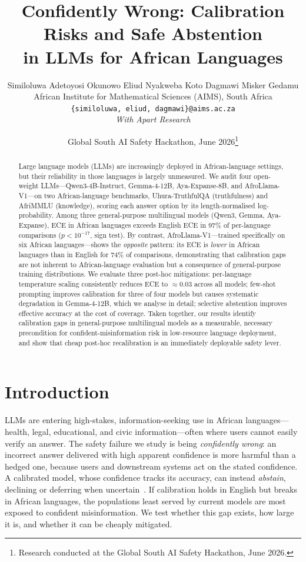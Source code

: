 \documentclass[11pt,a4paper]{article}
\title{\textbf{Confidently Wrong: Calibration Risks and Safe Abstention\\
       in LLMs for African Languages}}
\author{%
  Similoluwa Adetoyosi Okunowo \quad Eliud Nyakweba Koto \quad Dagmawi Misker Gedamu\\
  African Institute for Mathematical Sciences (AIMS), South Africa\\
  \texttt{\{similoluwa, eliud, dagmawi\}@aims.ac.za}\\[4pt]
  \textit{With Apart Research}
}
\date{Global South AI Safety Hackathon, June 2026\footnote{Research conducted
at the Global South AI Safety Hackathon, June 2026.}}
\begin{document}
\maketitle

\begin{abstract}
Large language models (LLMs) are increasingly deployed in African-language
settings, but their reliability in those languages is largely unmeasured. We
audit four open-weight LLMs---Qwen3-4B-Instruct, Gemma-4-12B, Aya-Expanse-8B,
and AfroLlama-V1---on two African-language benchmarks, Uhura-TruthfulQA
(truthfulness) and AfriMMLU (knowledge), scoring each answer option by its
length-normalised log-probability. Among three general-purpose multilingual
models (Qwen3, Gemma, Aya-Expanse), ECE in African languages exceeds English
ECE in 97\% of per-language comparisons ($p < 10^{-17}$, sign test). By
contrast, AfroLlama-V1---trained specifically on six African languages---shows
the \emph{opposite} pattern: its ECE is \emph{lower} in African languages than
in English for 74\% of comparisons, demonstrating that calibration gaps are not
inherent to African-language evaluation but a consequence of general-purpose
training distributions. We evaluate three post-hoc mitigations: per-language
temperature scaling consistently reduces ECE to ${\approx}0.03$ across all
models; few-shot prompting improves calibration for three of four models but
causes systematic degradation in Gemma-4-12B, which we analyse in detail;
selective abstention improves effective accuracy at the cost of coverage. Taken
together, our results identify calibration gaps in general-purpose multilingual
models as a measurable, necessary precondition for confident-misinformation risk
in low-resource language deployment, and show that cheap post-hoc recalibration
is an immediately deployable safety lever.
\end{abstract}

\section{Introduction}
\label{sec:intro}

LLMs are entering high-stakes, information-seeking use in African languages---
health, legal, educational, and civic information---often where users cannot
easily verify an answer. The safety failure we study is being \emph{confidently
wrong}: an incorrect answer delivered with high apparent confidence is more
harmful than a hedged one, because users and downstream systems act on the
stated confidence. A calibrated model, whose confidence tracks its accuracy,
can instead \emph{abstain}, declining or deferring when
uncertain~\citep{tomani2024abstention}. If calibration holds in English but
breaks in African languages, the populations least served by current models are
most exposed to confident misinformation. We test whether this gap exists, how
large it is, and whether it can be cheaply mitigated.
\end{document}
